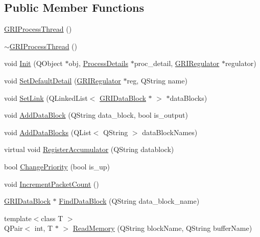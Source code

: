 \subsection*{\-Public \-Member \-Functions}
\begin{DoxyCompactItemize}
\item 
\hyperlink{classGRIProcessThread_af1890e0d920278fb3e25a7529cc2344b}{\-G\-R\-I\-Process\-Thread} ()
\item 
\hyperlink{classGRIProcessThread_a48b6a83b1a7fb9c8821a7ef7dc8691fb}{$\sim$\-G\-R\-I\-Process\-Thread} ()
\item 
void \hyperlink{classGRIProcessThread_afd2898f6205acf10a043ce2f975060d8}{\-Init} (\-Q\-Object $\ast$obj, \hyperlink{GRIProcessThread_8h_ab4fa503b74fbe1a0d3f06563657266b5}{\-Process\-Details} $\ast$proc\-\_\-detail, \hyperlink{classGRIRegulator}{\-G\-R\-I\-Regulator} $\ast$regulator)
\item 
void \hyperlink{classGRIProcessThread_abffdc9b4b9a11f7ba82d8f19303d0422}{\-Set\-Default\-Detail} (\hyperlink{classGRIRegulator}{\-G\-R\-I\-Regulator} $\ast$reg, \-Q\-String name)
\item 
void \hyperlink{classGRIProcessThread_a940321bc2c1394e78c6988f6b8483e72}{\-Set\-Link} (\-Q\-Linked\-List$<$ \hyperlink{classGRIDataBlock}{\-G\-R\-I\-Data\-Block} $\ast$ $>$ $\ast$data\-Blocks)
\item 
void \hyperlink{classGRIProcessThread_a37a669e1ac2cd5eacf6e000cf4d91b9b}{\-Add\-Data\-Block} (\-Q\-String data\-\_\-block, bool is\-\_\-output)
\item 
void \hyperlink{classGRIProcessThread_a6a070aaf4a3e6ccf042cdb30fdd40606}{\-Add\-Data\-Blocks} (\-Q\-List$<$ \-Q\-String $>$ data\-Block\-Names)
\item 
virtual void \hyperlink{classGRIProcessThread_a8b3b4638df86b300f94451d81bddbf37}{\-Register\-Accumulator} (\-Q\-String datablock)
\item 
bool \hyperlink{classGRIProcessThread_a9b83487a70b73295d60a6e06b79d6439}{\-Change\-Priority} (bool is\-\_\-up)
\item 
void \hyperlink{classGRIProcessThread_ac6294955a90c57b1cad154729c581b81}{\-Increment\-Packet\-Count} ()
\item 
\hyperlink{classGRIDataBlock}{\-G\-R\-I\-Data\-Block} $\ast$ \hyperlink{classGRIProcessThread_a987a42ec5631acf403405e1474abe08b}{\-Find\-Data\-Block} (\-Q\-String data\-\_\-block\-\_\-name)
\item 
{\footnotesize template$<$class T $>$ }\\\-Q\-Pair$<$ int, \-T $\ast$ $>$ \hyperlink{classGRIProcessThread_a6630afde2e55a2ae57589fed46daa5d7}{\-Read\-Memory} (\-Q\-String block\-Name, \-Q\-String buffer\-Name)

\end{DoxyCompactItemize}
